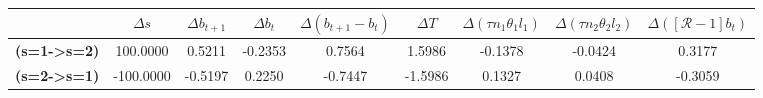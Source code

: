\begin{tiny}\begin{tabular}{|l|c|c|c|c|c|c|c|c|}
\hline
&\textbf{$\Delta s$}&\textbf{$\Delta b_{t+1}$}&\textbf{$\Delta b_{t}$}&\textbf{$\Delta (b_{t+1}-b_{t})$}&\textbf{$\Delta T$}&\textbf{$\Delta (\tau n_1\theta_1 l_1 )$}&\textbf{$\Delta (\tau n_2\theta_2 l_2)$}&\textbf{$\Delta ([\mathcal{R}-1]b_t)$}\\\hline
\textbf{(s=1->s=2)}&100.0000&0.5211&-0.2353&0.7564&1.5986&-0.1378&-0.0424&0.3177\\\hline
\textbf{ (s=2->s=1)}&-100.0000&-0.5197&0.2250&-0.7447&-1.5986&0.1327&0.0408&-0.3059\\\hline
\end{tabular}
\end{tiny}